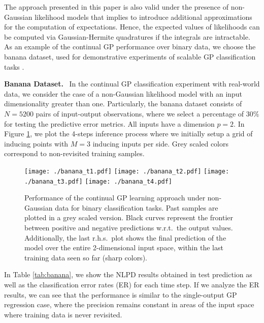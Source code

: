 \documentclass[]{article}
\begin{document}
The approach presented in this paper is also valid under the presence of non-Gaussian likelihood models that implies to introduce additional approximations for the computation of expectations. Hence, the expected values of likelihoods can be computed via Gaussian-Hermite quadratures if the integrals are intractable. As an example of the continual GP performance over binary data, we choose the banana dataset, used for demonstrative experiments of scalable GP classification tasks \citep{hensman2015scalable,bui2017streaming}.


\textbf{Banana Dataset.}~ In the continual GP classification experiment with real-world data, we consider the case of a non-Gaussian likelihood model with an input dimensionality greater than one. Particularly, the banana dataset consists of $N=5200$ pairs of input-output observations, where we select a percentage of $30\%$ for testing the predictive error metrics. All inputs have a dimension $p=2$. In Figure \ref{fig:banana}, we plot the 4-steps inference process where we initially setup a grid of inducing points with $M=3$ inducing inputs per side. Grey scaled colors correspond to non-revisited training samples.

\begin{figure}[] \centering
	\texttt{[image: ./banana\_t1.pdf]}
	\texttt{[image: ./banana\_t2.pdf]}
	\texttt{[image: ./banana\_t3.pdf]}
	\texttt{[image: ./banana\_t4.pdf]}
	\caption{Performance of the continual GP learning approach under non-Gaussian data for binary classification tasks. Past samples are plotted in a grey scaled version. Black curves represent the frontier between positive and negative predictions w.r.t.\ the output values. Additionally, the last r.h.s.\ plot shows the final prediction of the model over the entire 2-dimensional input space, within the last training data seen so far (sharp colors).}
	\label{fig:banana}
\end{figure}

In Table \ref{tab:banana}, we show the NLPD results obtained in test prediction as well as the classification error rates (ER) for each time step. If we analyze the ER results, we can see that the performance is similar to the single-output GP regression case, where the precision remains constant in areas of the input space where training data is never revisited. 
\end{document}
